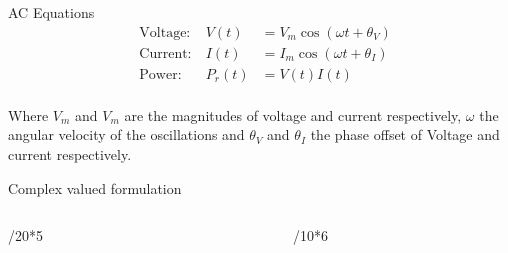 \documentclass[final]{beamer}
\newlength{\colwidth}
\begin{document}
\begin{frame}[t]
\begin{columns}[t]
\begin{column}{\colwidth}
\begin{alertblock}{AC Equations}
    \begin{equation}
      \begin{aligned}
          &\text{Voltage:}& \ V(t) &= V_m \cos(\omega t + \theta_V) \\
          &\text{Current:}& \ I(t) &= I_m \cos(\omega t + \theta_I) \\
          &\text{Power:}  & \ P_r(t) &= V(t)I(t)\\
      \end{aligned}
    \end{equation}

    Where $V_m$ and $V_m$ are the magnitudes of voltage and current respectively,
    $\omega$ the angular velocity of the oscillations and $\theta_V$ and $\theta_I$
    the phase offset of Voltage and current respectively.

  \end{alertblock}

  \begin{alertblock}{Complex valued formulation}
    \begin{columns}[t]
      
      \begin{column}{\colwidth/20*5}

        \begin{figure}
          \centering
        \end{figure}

      \end{column}

      \begin{column}{\colwidth/10*6}


\end{column}
\end{columns}
\end{alertblock}
\end{column}
\end{columns}
\end{frame}
\end{document}
